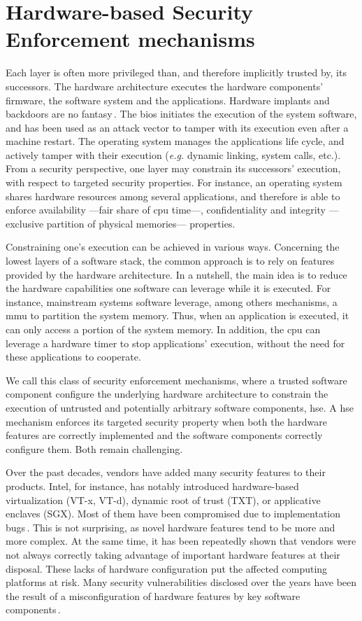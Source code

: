 \section{Hardware-based Security Enforcement mechanisms}

Each layer is often more privileged than, and therefore implicitly trusted by,
its successors.
%
The hardware architecture executes the hardware components' firmware, the
software system and the applications.
%
Hardware implants and backdoors are no fantasy\,\cite{yang2016a2}.
%
The \ac{bios} initiates the execution of the system software, and has been used
as an attack vector to tamper with its execution even after a machine restart.
%
The operating system manages the applications life cycle, and actively tamper
with their execution (\emph{e.g.} dynamic linking, system calls, etc.).
%
From a security perspective, one layer may constrain its successors' execution,
with respect to targeted security properties.
%
For instance, an operating system shares hardware resources among several
applications, and therefore is able to enforce availability ---fair share of
\ac{cpu} time---, confidentiality and integrity ---exclusive partition of
physical memories--- properties.

Constraining one's execution can be achieved in various ways.
%
Concerning the lowest layers of a software stack, the common approach is to rely
on features provided by the hardware architecture.
%
In a nutshell, the main idea is to reduce the hardware capabilities one software
can leverage while it is executed.
%
For instance, mainstream systems software leverage, among others mechanisms, a
\ac{mmu} to partition the system memory.
%
Thus, when an application is executed, it can only access a portion of the
system memory.
%
In addition, the \ac{cpu} can leverage a hardware timer to stop applications'
execution, without the need for these applications to cooperate.

We call this class of security enforcement mechanisms, where a trusted software
component configure the underlying hardware architecture to constrain the
execution of untrusted and potentially arbitrary software components, \ac{hse}.
%
A \ac{hse} mechanism enforces its targeted security property when both the
hardware features are correctly implemented and the software components
correctly configure them.
%
Both remain challenging.

Over the past decades, vendors have added many security features to their
products.
%
Intel, for instance, has notably introduced hardware-based virtualization (VT-x,
VT-d), dynamic root of trust (TXT), or applicative enclaves (SGX).
%
Most of them have been compromised due to implementation
bugs\,\cite{wojtczuk2011txtbug,sang2010iommu}.
%
This is not surprising, as novel hardware features tend to be more and more
complex.
%
At the same time, it has been repeatedly shown that vendors were not always
correctly taking advantage of important hardware features at their disposal.
%
These lacks of hardware configuration put the affected computing platforms at
risk.
%
Many security vulnerabilities disclosed over the years have been the result of a
misconfiguration of hardware features by key software
components\,\cite{bulygin2014bios}.

